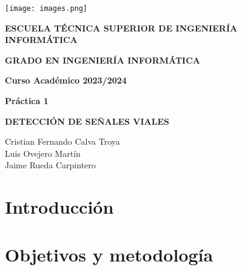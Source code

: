 \documentclass[a4paper, 12pt]{article}
\begin{document}
\begin{titlepage}
	\begin{center}
		\texttt{[image: images.png]}
		\vspace{1.75cm}
		
		\large
		\textbf{ESCUELA TÉCNICA SUPERIOR DE INGENIERÍA INFORMÁTICA}
		\vspace{1cm}
		
		\large
		\textbf{GRADO EN INGENIERÍA INFORMÁTICA}
		
		
		
		\large
		\textbf{Curso Académico 2023/2024}
		
		\vspace{1cm}
		\large
		\textbf{Práctica 1}
		
		\vspace{2cm}
		
		\large
		\textbf{DETECCIÓN DE SEÑALES VIALES}
		
		\vspace{2cm}
		
		\large
		Cristian Fernando Calva Troya \\
		Luis Ovejero Martín \\
		Jaime Rueda Carpintero
		\vspace{1cm}
	\end{center}
\end{titlepage}

\newpage
\thispagestyle{empty} 
\mbox{} 

\newpage
\newpage
\listoffigures
\newpage

{\small
	\tableofcontents 
}
\newpage

\section{Introducción}
\section{Objetivos y metodología}
\end{document}

